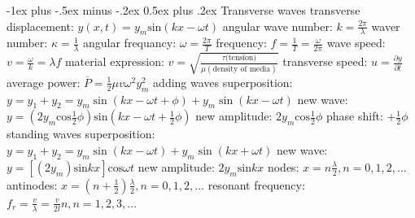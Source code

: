 \documentclass[10pt,landscape]{article}
\makeatletter
\renewcommand{\subsection}{\@startsection{subsection}{2}{0mm}%
                                {-1ex plus -.5ex minus -.2ex}%
                                {0.5ex plus .2ex}%
                                {\normalfont\normalsize\bfseries}}
\newcommand{\spc}{\hspace*{1em}}
\makeatother
\begin{document}
\begin{multicols*}{3}
\subsection{Transverse waves}
transverse displacement: $y(x,t)=y_m\mathrm{sin}(kx-\omega t)$
\newline
\spc angular wave number: $k=\frac{2\pi }{\lambda }$
\newline
\spc waver number: $\kappa =\frac{1}{\lambda }$
\newline
\spc angular frequancy: $\omega =\frac{2 \pi}{T}$
\newline
\spc frequency: $f=\frac{1}{T}=\frac{\omega }{2 \pi}$
\newline
\spc wave speed: $v=\frac{\omega }{k}=\lambda f$
\newline
\spc \spc material expression: $v=\sqrt{\frac{\tau \textrm{(tension)}}{\mu (\textrm{density of media})}}$
\newline
\spc transverse speed: $u=\frac{\partial y}{\partial t}$
\newline
\spc average power: $\overline{P}=\frac{1}{2}\mu v\omega ^2y_m^2$
\newline \newline \newline \newline
adding waves
\newline
\spc superposition: $y=y_1+y_2=y_m\sin (kx-\omega t+\phi)+y_m\sin (kx-\omega t)$
\newline
\spc new wave: $y=(2y_m\mathrm{cos}\frac{1}{2}\phi)\mathrm{sin}(kx-\omega t+\frac{1}{2}\phi)$
\newline
\spc new amplitude: $2y_m\mathrm{cos}\frac{1}{2}\phi$
\newline
\spc phase shift: $+\frac{1}{2}\phi$
\newline
\newline
standing waves
\newline
\spc superposition: $y=y_1+y_2=y_m \sin (kx-\omega t)+y_m \sin (kx+\omega t)$
\newline
\spc new wave: $y=[(2y_m)\mathrm{sin}kx]\mathrm{cos}\omega t$
\newline
\spc new amplitude: $2y_m\mathrm{sin}kx$
\newline
\spc nodes: $x=n\frac{\lambda }{2}, n=0,1,2,...$
\newline
\spc antinodes: $x=(n+\frac{1}{2})\frac{\lambda }{2}, n=0,1,2,...$
\newline
\spc resonant frequency: $f_r=\frac{v}{\lambda }=\frac{v}{2l}n, n=1,2,3,...$


\end{multicols*}
\end{document}
